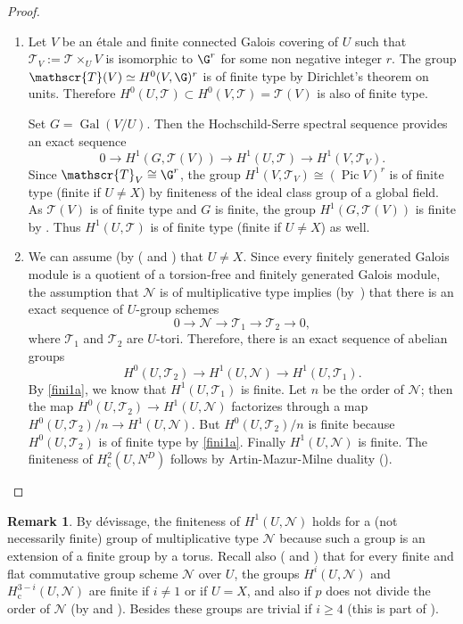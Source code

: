 \documentclass[JEP,XML,SOM,Unicode, NoEqCountersInSection]{cedram}
\let\mathcal\mathscr
\newenvironment{enumeratea}
{\bgroup\def\theenumi{\alph{enumi}}\begin{enumerate}}
{\end{enumerate}\egroup}
\newcommand{\rc}{\mathrm{c}}
\theoremstyle{plain}
\theoremstyle{definition}
\newtheorem{rema}[theo]{Remark}
\DeclareMathOperator \pic {Pic}
\DeclareMathOperator \gal {Gal}
\newcommand\cN {\mathcal{N}}
\newcommand \cT {\mathcal{T}}
\begin{document}
\skpt\begin{proof}
\begin{enumeratea}
\item
Let $V$ be an étale and finite connected
Galois covering of $U$ such that $\cT_V:=\cT \times_U V$
is isomorphic to $\G^r$ for some non negative integer $r$.
The group $\cT(V) \simeq
H^0(V,\G)^r$ is of finite type by Dirichlet's theorem on units. Therefore
$H^0(U,\cT) \subset H^0(V,\cT)=\cT(V)$
is also of finite type.

Set $G=\gal(V/U)$. Then the Hochschild-Serre spectral sequence provides an
exact sequence
\[
0 \to H^1(G,\cT(V)) \to H^1(U,\cT)
\to H^1(V,\cT_V).
\]
Since $\cT_V \cong \G^r$, the group
$H^1(V,\cT_V) \cong (\pic V)^r$ is of finite type
(\resp finite if $U \neq X$) by finiteness of the ideal class group
of a global field.
As $\cT(V)$ is of finite type and $G$ is finite, the group
$H^1(G,\cT(V))$ is finite by \cite[Chap.\,VIII, Cor.\,2]{col}.
Thus $H^1(U,\cT)$ is of
finite type (\resp finite if $U \neq X$) as well.

\item
We can assume (by (\cite[Lem.\,III.8.9]{MilADT}
and \cite[Cor.\,4.9]{DemH}) that $U \neq X$.
Since every finitely generated Galois module is a quotient of a
torsion-free and finitely generated Galois module, the
assumption that $\cN$ is of multiplicative type implies
(by~\cite[X, Prop.\,1.1]{sga3})
that there is an exact sequence of $U$-group schemes
\[
0 \to \cN \to \cT_1 \to \cT_2 \to 0,
\]
where $\cT_1$ and $\cT_2$ are $U$-tori. Therefore, there is
an exact sequence of abelian groups
\[
H^0(U,\cT_2) \to H^1(U, \cN) \to H^1(U, \cT_1).
\]
By \eqref{fini1a}, we know that $H^1(U, \cT_1)$ is finite. Let $n$ be the order
of $\cN$; then the map $H^0(U,\cT_2) \to H^1(U, \cN)$
factorizes through a map $H^0(U,\cT_2)/n \to H^1(U, \cN)$.
But $H^0(U,\cT_2)/n$ is finite because $H^0(U,\cT_2)$
is of finite type by \eqref{fini1a}. Finally $H^1(U, \cN)$ is finite. The
finiteness of $H^2_\rc(U,N^D)$ follows by Artin-Mazur-Milne
duality (\cite[Th.\,1.1]{DemH}).\qedhere
\end{enumeratea}
\end{proof}

\begin{rema} \label{fini2}
By dévissage, the finiteness of $H^1(U, \cN)$ holds for
a (not necessarily finite)
group of multiplicative type $\cN$
because such a group is an extension of
a finite group by a torus. Recall also (\cite[Lem.\,III.8.9]{MilADT}
and \cite[Cor.\,4.8]{DemH})
that for every finite and flat commutative
group scheme $\cN$ over $U$, the groups $H^i(U,\cN)$ and
$H^{3-i}_\rc(U,\cN)$ are finite if $i \neq 1$ or if $U=X$, and
also if $p$ does not divide the order of $\cN$ (by \cite[Prop.\,2.1\,(4)]{DemH} and \cite[Th.\,II.3.1]{MilADT}).
Besides these groups are trivial if $i \geq 4$ (this is part of \cite[Th.\,1.1]{DemH}).
\end{rema}
\end{document}
